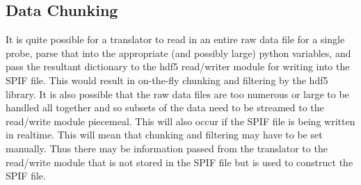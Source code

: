 \documentclass[12pt,a4paper]{article}
\begin{document}
\subsection{Data Chunking}

It is quite possible for a translator to read in an entire raw data file for a single probe, parse that into the appropriate (and possibly large) python variables, and pass the resultant dictionary to the hdf5 read/writer module for writing into the SPIF file. This would result in on-the-fly chunking and filtering by the hdf5 library. It is also possible that the raw data files are too numerous or large to be handled all together and so subsets of the data need to be streamed to the read/write module piecemeal. This will also occur if the SPIF file is being written in realtime. This will mean that chunking and filtering may have to be set manually. Thus there may be information passed from the translator to the read/write module that is not stored in the SPIF file but is used to construct the SPIF file.






\label{LastPage}
\end{document}

